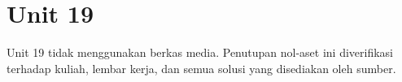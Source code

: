 \section*{Unit 19}
Unit 19 tidak menggunakan berkas media. Penutupan nol-aset ini diverifikasi terhadap kuliah, lembar kerja, dan semua solusi yang disediakan oleh sumber.
